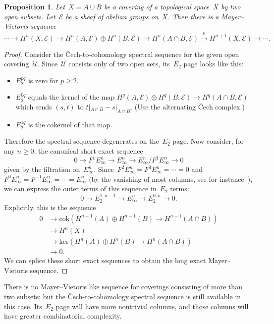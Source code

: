 \documentclass[10pt]{amsart}
\theoremstyle{definition}
\theoremstyle{plain}
\newtheorem{prop}[defn]{Proposition}
\theoremstyle{remark}
\newcommand{\E}{\mathcal{E}}
\newcommand{\U}{\mathcal{U}}
\newcommand{\lra}{\longrightarrow}
\begin{document}
\begin{prop}Let~$X = A \cup B$ be a covering of a topological space~$X$
by two open subsets. Let~$\E$ be a sheaf of abelian groups on~$X$. Then there
is a Mayer--Vietoris sequence
\[ \cdots \lra H^n(X, \E) \lra
  H^n(A, \E) \oplus H^n(B, \E) \lra
  H^n(A \cap B, \E) \stackrel{\partial}{\lra} H^{n+1}(X, \E) \lra \cdots. \]
\end{prop}
\begin{proof}Consider the Čech-to-cohomology spectral sequence for the
given open covering~$\U$. Since~$\U$ consists only of two open sets, its~$E_2$ page looks like this:
\begin{itemize}
\item $E_2^{pq}$ is zero for $p \geq 2$.
\item $E_2^{0q}$ equals the kernel of the map $H^q(A,\E) \oplus H^q(B,\E) \to H^q(A
\cap B,\E)$ which sends $(s,t)$ to $t|_{A \cap B} - s|_{A \cap B}$. (Use the
alternating Čech complex.)
\item $E_2^{1q}$ is the cokernel of that map.
\end{itemize}
Therefore the spectral sequence degenerates on the~$E_2$ page. Now
consider, for any $n \geq 0$, the canonical short exact sequence
\[ 0 \longrightarrow F^1 E_\infty^n \longrightarrow E_\infty^n
\longrightarrow E_\infty^n/F^1 E_\infty^n \longrightarrow 0 \]
given by the filtration on~$E_\infty^n$.
Since~$F^2 E_\infty^n = F^3 E_\infty^n = \cdots = 0$ and~$F^0 E_\infty^n =
F^{-1} E_\infty^n = \cdots = E_\infty^n$ (by the vanishing of most
columns, see for instance~\cite{greenberg}),
we can express the outer terms of this sequence in~$E_2$ terms:
\[ 0 \longrightarrow E_2^{1,n-1} \longrightarrow E_\infty^n
\longrightarrow E_2^{0,n} \longrightarrow 0. \]
Explicitly, this is the sequence
\begin{align*}
  0 &\longrightarrow \mathrm{cok}(H^{n-1}(A) \oplus H^{n-1}(B) \to
H^{n-1}(A \cap B)) \\
  &\longrightarrow H^n(X) \\
  &\longrightarrow \mathrm{ker}(H^n(A) \oplus H^n(B) \to H^n(A \cap B)) \\
  &\longrightarrow 0.
\end{align*}
We can splice these short exact sequences to obtain the long exact
Mayer--Vietoris sequence.
\end{proof}

There is no Mayer--Vietoris like sequence for coverings consisting of more than
two subsets; but the Čech-to-cohomology spectral sequence is still available in
this case. Its~$E_2$ page will have more nontrivial columns, and those columns
will have greater combinatorial complexity.
\end{document}
